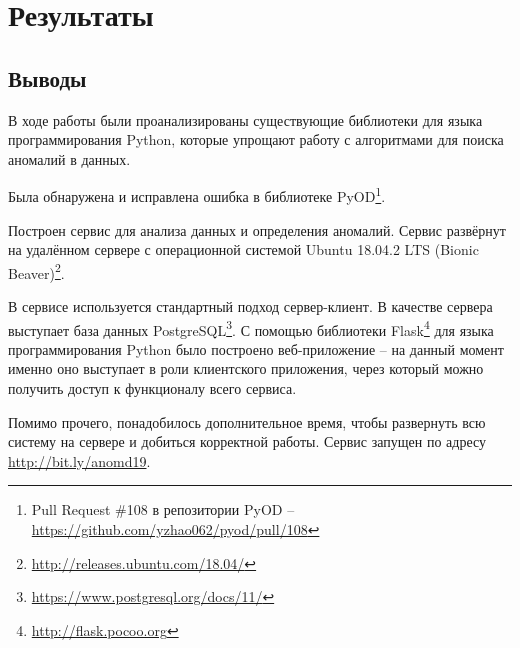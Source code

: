 \chapter{Результаты} \label{ch:ch4}

\section{Выводы} \label{ch:ch4/sect1}

В ходе работы были проанализированы существующие библиотеки для языка программирования Python, которые упрощают работу с алгоритмами для поиска аномалий в данных.

Была обнаружена и исправлена ошибка в библиотеке PyOD\footnote{Pull Request \#108 в репозитории PyOD -- \url{https://github.com/yzhao062/pyod/pull/108}}.

Построен сервис для анализа данных и определения аномалий. Сервис развёрнут на удалённом сервере с операционной системой Ubuntu 18.04.2 LTS (Bionic Beaver)\footnote{\url{http://releases.ubuntu.com/18.04/}}.

В сервисе используется стандартный подход сервер-клиент. В качестве сервера выступает база данных PostgreSQL\footnote{\url{https://www.postgresql.org/docs/11/}}. С помощью библиотеки Flask\footnote{\url{http://flask.pocoo.org}} для языка программирования Python было построено веб-приложение -- на данный момент именно оно выступает в роли клиентского приложения, через который можно получить доступ к функционалу всего сервиса.

Помимо прочего, понадобилось дополнительное время, чтобы развернуть всю систему на сервере и добиться корректной работы. Сервис запущен по адресу \url{http://bit.ly/anomd19}.

\clearpage